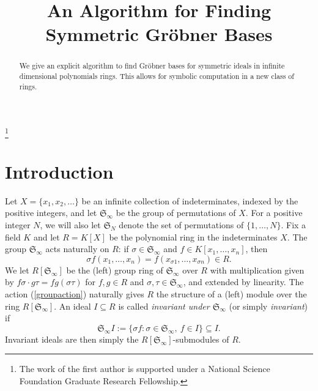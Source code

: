 \documentclass{amsart}
\theoremstyle{definition}
\theoremstyle{remark}
\numberwithin{equation}{section}
\newcommand{\<}{\langle}
\renewcommand{\>}{\rangle}
\begin{document}
 \title[An Algorithms for Finding Symmetric Gr\"obner Bases]
{An Algorithm for Finding \\ Symmetric Gr\"obner Bases}


 
 \thanks{The work of the first author is supported under a National Science 
 Foundation Graduate Research Fellowship.} 

%
%



\begin{abstract}
We give an explicit algorithm to find Gr\"obner bases for symmetric
ideals in infinite dimensional polynomials rings.  This allows for symbolic computation
in a new class of rings.
\end{abstract} 

\maketitle 

\section{Introduction}
Let $X = \{x_1,x_2,\ldots\}$ be an infinite collection of
indeterminates, indexed by the positive integers, and let ${\mathfrak S}_{\infty}$ be the group of
permutations of $X$.  For a positive integer $N$, we will also let 
${\mathfrak S}_N$ denote the set of permutations of $\{1,\ldots,N\}$.
Fix a field $K$ and let $R = K[X]$ be the polynomial ring in the indeterminates $X$.  The group
${\mathfrak S}_{\infty}$ acts naturally on $R$: if $\sigma \in {\mathfrak
  S}_{\infty}$ and $f\in K[x_1,\dots,x_n]$, then 
\begin{equation}\label{groupaction}
\sigma f(x_1,\ldots,x_n) = f( x_{\sigma1},\dots,  x_{\sigma n})\in R.
\end{equation}
We let $R[{\mathfrak S}_{\infty}]$ be the (left) group ring of ${\mathfrak S}_{\infty}$ over $R$ 
with multiplication given by $f\sigma\cdot g\tau = fg(\sigma\tau)$ for $f,g\in R$ and
$\sigma,\tau\in {\mathfrak S}_{\infty}$, and extended by linearity.
The action (\ref{groupaction}) naturally gives $R$ the structure of a (left) module over the
ring $R[{\mathfrak S}_{\infty}]$.
An ideal $I \subseteq R$ is called \textit{invariant under ${\mathfrak S}_{\infty}$}
(or simply \textit{invariant}) if \[ {\mathfrak S}_{\infty}I := \{\sigma f
: \sigma \in {\mathfrak S}_{\infty}, \ f \in I\} \subseteq I.\] 
Invariant ideals are then simply the $R[{\mathfrak S}_{\infty}]$-submodules of
$R$.  
\end{document}
